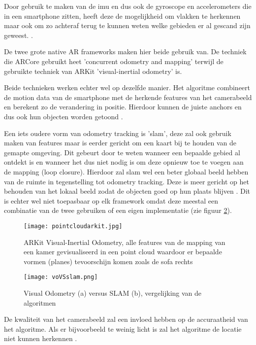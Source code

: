 Door gebruik te maken van de \acrshort{imu} en dus ook de gyroscope en accelerometers die in een smartphone zitten, heeft deze de mogelijkheid om vlakken te herkennen maar ook om zo achteraf terug te kunnen weten welke gebieden er al gescand zijn geweest. \autocite{Leutenegger2015}.

De twee grote native AR frameworks maken hier beide gebruik van. De techniek die ARCore gebruikt heet 'concurrent odometry and mapping' \autocite{ARCoreConcepts} terwijl de gebruikte techniek van ARKit 'visual-inertial odometry' \autocite{ARKitWorldTracking} is. 

Beide technieken werken echter wel op dezelfde manier. Het algoritme combineert de motion data van de smartphone met de herkende features van het camerabeeld en berekent zo de verandering in positie. Hierdoor kunnen de juiste anchors en dus ook hun objecten worden getoond \autocite{ARCoreConcepts} \autocite{ARKitWorldTracking}.

Een iets oudere vorm van odometry tracking is '\acrfull{slam}', deze zal ook gebruik maken van features maar is eerder gericht om een kaart bij te houden van de gemapte omgeving. Dit gebeurt door te weten wanneer een bepaalde gebied al ontdekt is en wanneer het dus niet nodig is om deze opnieuw toe te voegen aan de mapping (loop closure). Hierdoor zal \acrshort{slam} wel een beter globaal beeld hebben van de ruimte in tegenstelling tot odometry tracking. Deze is meer gericht op het behouden van het lokaal beeld zodat de objecten goed op hun plaats blijven \autocite{Yousif2015}. Dit is echter wel niet toepasbaar op elk framework omdat deze meestal een combinatie van de twee gebruiken of een eigen implementatie (zie figuur \ref{fig:voVSslam}).

\begin{figure}
    \texttt{[image: pointcloudarkit.jpg]}
    \caption{ARKit Visual-Inertial Odometry, alle features van de mapping van een kamer gevisualiseerd in een point cloud waardoor er bepaalde vormen (planes) tevoorschijn komen zoals de sofa rechts \autocite{Voloshin2018}}
    \label{fig:pointcloudarkit}
\end{figure}

\begin{figure}
    \texttt{[image: voVSslam.png]}
    \caption{Visual Odometry (a) versus SLAM (b), vergelijking van de algoritmen \autocite{Yousif2015}}
    \label{fig:voVSslam}
\end{figure}


De kwaliteit van het camerabeeld zal een invloed hebben op de accuraatheid van het algoritme. Als er bijvoorbeeld te weinig licht is zal het algoritme de locatie niet kunnen herkennen \autocite{ARKitImages}.

